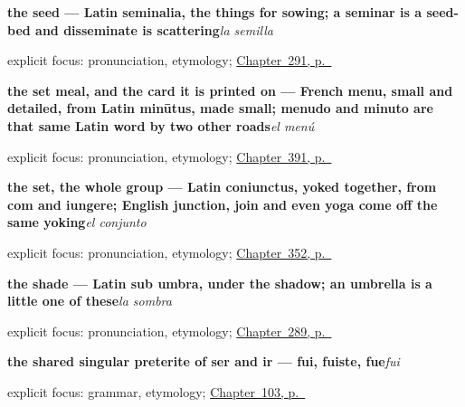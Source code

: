 \noindent\begin{minipage}[t]{\linewidth}
\raggedright
\textbf{the seed — Latin seminalia, the things for sowing; a seminar is a seed-bed and disseminate is scattering}\enspace\emph{la semilla}\par
\footnotesize explicit focus: pronunciation, etymology; \hyperref[ch:de-la-semilla]{Chapter~291, p.~\pageref*{ch:de-la-semilla}}
\end{minipage}\par\smallskip

\noindent\begin{minipage}[t]{\linewidth}
\raggedright
\textbf{the set meal, and the card it is printed on — French menu, small and detailed, from Latin minūtus, made small; menudo and minuto are that same Latin word by two other roads}\enspace\emph{el menú}\par
\footnotesize explicit focus: pronunciation, etymology; \hyperref[ch:el-menu-y-el-camarero]{Chapter~391, p.~\pageref*{ch:el-menu-y-el-camarero}}
\end{minipage}\par\smallskip

\noindent\begin{minipage}[t]{\linewidth}
\raggedright
\textbf{the set, the whole group — Latin coniunctus, yoked together, from com and iungere; English junction, join and even yoga come off the same yoking}\enspace\emph{el conjunto}\par
\footnotesize explicit focus: pronunciation, etymology; \hyperref[ch:el-conjunto-y-el-resto]{Chapter~352, p.~\pageref*{ch:el-conjunto-y-el-resto}}
\end{minipage}\par\smallskip

\noindent\begin{minipage}[t]{\linewidth}
\raggedright
\textbf{the shade — Latin sub umbra, under the shadow; an umbrella is a little one of these}\enspace\emph{la sombra}\par
\footnotesize explicit focus: pronunciation, etymology; \hyperref[ch:lo-de-arriba]{Chapter~289, p.~\pageref*{ch:lo-de-arriba}}
\end{minipage}\par\smallskip

\noindent\begin{minipage}[t]{\linewidth}
\raggedright
\textbf{the shared singular preterite of ser and ir — fui, fuiste, fue}\enspace\emph{fui}\par
\footnotesize explicit focus: grammar, etymology; \hyperref[ch:preterite]{Chapter~103, p.~\pageref*{ch:preterite}}
\end{minipage}\par\smallskip

